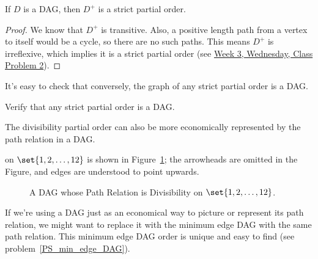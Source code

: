 \begin{lemma}
If $D$ is a DAG, then $D^+$ is a strict partial order.
\end{lemma}

\begin{proof}
We know that $D^+$ is transitive.  Also, a positive length path from a
vertex to itself would be a cycle, so there are no such paths.  This means
$D^+$ is irreflexive, which implies it is a strict partial order (see
\href{http://courses.csail.mit.edu/6.042/spring09/cp3r.pdf}{Week 3,
Wednesday, Class Problem 2}).
\end{proof}

It's easy to check that conversely, the graph of any strict partial order
is a DAG.

\begin{notesproblem}
Verify that any strict partial order is a DAG.

\end{notesproblem}
\fi

The divisibility partial order can also be more economically represented by
the path relation in a DAG.   on $\set{1,2,\dots,12}$ is shown in
Figure~\ref{fig:divisibility-DAG}; the arrowheads are omitted in the
Figure, and edges are understood to point upwards.

\begin{figure}[h]
\begin{center}

\end{center}
\caption{A DAG whose Path Relation is Divisibility on $\set{1,2,\dots,12}$.}
\label{fig:divisibility-DAG}
\end{figure}


If we're using a DAG just as an economical way to picture or represent its
path relation, we might want to replace it with the minimum edge DAG with
the same path relation.  This minimum edge DAG order is unique and easy to
find (see problem~\ref{PS_min_edge_DAG}).

\begin{problems}
\homeworkproblems
{}
\end{problems}


\endinput
